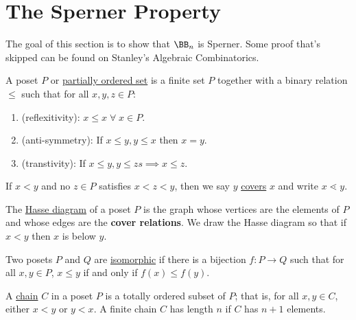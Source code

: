 \section{The Sperner Property}
The goal of this section is to show that \( \BB_n \) is Sperner. Some proof that's skipped can be
found on Stanley's Algebraic Combinatorics.

\begin{definition}
	A poset \( P \) or \underline{partially ordered set} is a finite set \( P \) together with a binary
	relation \( \leq \) such that for all \( x, y, z \in P \):
	\begin{enumerate}
		\item (reflexitivity): \( x \leq x \; \forall \; x\in P\).
		\item (anti-symmetry): If \( x\leq y, y\leq x \) then \( x=y \).
		\item (transtivity): If \( x \leq y, y\leq zs \implies x \leq z \).
	\end{enumerate}
\end{definition}

\begin{definition}
	If \( x < y \) and no \( z\in P \) satisfies \( x < z < y \), then we say \( y \)
	\underline{covers} \( x \) and write \( x \lessdot y \).
\end{definition}

\begin{definition}
	The \underline{Hasse diagram} of a poset \( P \) is the graph whose vertices are the elements of
	\( P \) and whose edges are the \textbf{cover relations}. We draw the Hasse diagram so that if \( x < y \)
	then \( x \) is below \( y \).
\end{definition}

\begin{definition}
	Two posets \( P \) and \( Q \) are \underline{isomorphic} if there is a bijection \( f: P \to Q \)
	such that for all \( x, y \in P \), \( x \leq y \) if and only if \( f(x) \leq f(y) \).
\end{definition}

\begin{definition}
	A \underline{chain} \( C \) in a poset \( P \) is a totally ordered subset of \( P \); that is,
	for all \( x, y \in C \), either \( x < y \) or \( y < x \). A finite chain \( C \) has length \(
	n\) if \( C \) has \( n+1 \) elements.
\end{definition}

